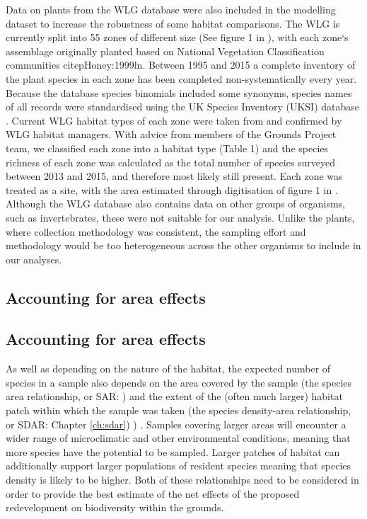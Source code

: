Data on plants from the WLG database were also included in the modelling dataset to increase the robustness of some habitat comparisons. The WLG is currently split into 55 zones of different size (See figure 1 in \citealt{Leigh:2003ln}), with each zone`s assemblage originally planted based on National Vegetation Classification communities citep{Honey:1999ln}. Between 1995 and 2015 a complete inventory of the plant species in each zone has been completed non-systematically every year. Because the database species binomials included some synonyms, species names of all records were standardised using the UK Species Inventory (UKSI) database \citep{Raper:2014wg}. Current WLG habitat types of each zone were taken from \citep{Leigh:2003ln} and confirmed by WLG habitat managers. With advice from members of the Grounds Project team, we classified each zone into a habitat type (Table 1) and the species richness of each zone was calculated as the total number of species surveyed between 2013 and 2015, and therefore most likely still present. Each zone was treated as a site, with the area estimated through digitisation of figure 1 in \cite{Leigh:2003ln}. Although the WLG database also contains data on other groups of organisms, such as invertebrates, these were not suitable for our analysis. Unlike the plants, where collection methodology was consistent, the sampling effort and methodology would be too heterogeneous across the other organisms to include in our analyses.

\ifappendixStyle %
\subsection{Accounting for area effects}%
\else
\subsection*{Accounting for area effects}
\fi
As well as depending on the nature of the habitat, the expected number of species in a sample also depends on the area covered by the sample (the species area relationship, or SAR: \citealt{rosenzweig:1995species}) and the extent of the (often much larger) habitat patch within which the sample was taken (the species density-area relationship, or SDAR: 
\ifappendixStyle %
Chapter \ref{ch:sdar})%
\else
\citealt{Phillips:2015sdar})
\fi
. Samples covering larger areas will encounter a wider range of microclimatic and other environmental conditions, meaning that more species have the potential to be sampled. Larger patches of habitat can additionally support larger populations of resident species meaning that species density is likely to be higher. Both of these relationships need to be considered in order to provide the best estimate of the net effects of the proposed redevelopment on biodiversity within the grounds.

